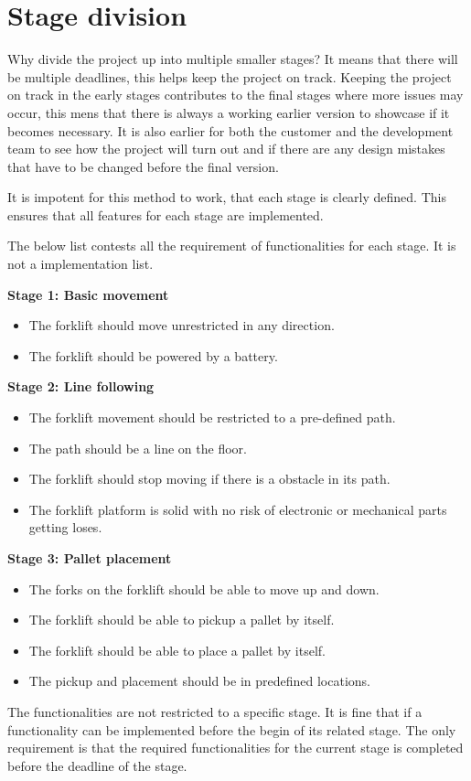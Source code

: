 \documentclass{article}
\begin{document}
    \section{Stage division}
    Why divide the project up into multiple smaller stages? It means
    that there will be multiple deadlines, this helps keep the project on
    track. Keeping the project on track in the early stages contributes to the
    final stages where more issues may occur, this mens that there is always a
    working earlier version to showcase if it becomes necessary. It is also
    earlier for both the customer and the development team to see how the
    project will turn out and if there are any design mistakes that have to be
    changed before the final version.

    It is impotent for this method to work, that each stage is clearly defined.
    This ensures that all features for each stage are implemented.

    The below list contests all the requirement of functionalities for each
    stage. It is not a implementation list.

    \textbf{Stage 1: Basic movement}
    \begin{itemize}
        \item The forklift should move unrestricted in any direction.
        \item The forklift should be powered by a battery.
    \end{itemize}

    \textbf{Stage 2: Line following}
    \begin{itemize}
        \item The forklift movement should be restricted to a pre-defined path.
        \item The path should be a line on the floor.
        \item The forklift should stop moving if there is a obstacle in its path.
        \item The forklift platform is solid with no risk of electronic or
        mechanical parts getting loses.
    \end{itemize}

    \textbf{Stage 3: Pallet placement}
    \begin{itemize}
        \item The forks on the forklift should be able to move up and down.
        \item The forklift should be able to pickup a pallet by itself.
        \item The forklift should be able to place a pallet by itself.
        \item The pickup and placement should be in predefined locations.
    \end{itemize}

    The functionalities are not restricted to a specific stage. It is fine that
    if a functionality can be implemented before the begin of its related
    stage.
    The only requirement is that the required functionalities for the current
    stage is completed before the deadline of the stage. 
\end{document}
